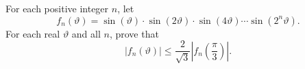 For each positive integer \(n\),
let \[f_{n}(\vartheta)=\sin(\vartheta)\cdot \sin(2\vartheta) \cdot \sin(4\vartheta)\cdots \sin(2^{n}\vartheta).\]
For each real \(\vartheta\) and all \(n\),
prove that
\[|f_{n}(\vartheta)| \leq \frac{2}{\sqrt{3}}|f_{n}(\frac{\pi}{3})|.\]